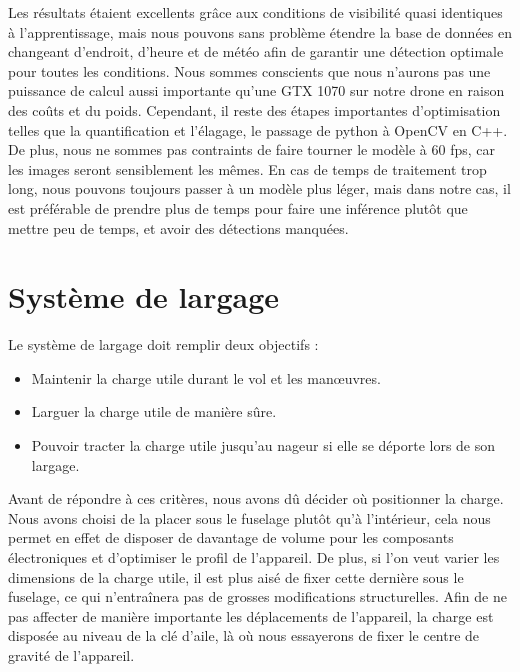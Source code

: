 \documentclass[a4paper,12pt,french]{report}
\begin{document}
Les résultats étaient excellents grâce aux conditions de visibilité quasi identiques à l'apprentissage, mais nous pouvons sans problème étendre la base de données en changeant d'endroit, d'heure et de météo afin de garantir une détection optimale pour toutes les conditions. Nous sommes conscients que nous n'aurons pas une puissance de calcul aussi importante qu'une GTX 1070 sur notre drone en raison des coûts et du poids. Cependant, il reste des étapes importantes d'optimisation telles que la quantification et l'élagage, le passage de python à OpenCV en C++. De plus, nous ne sommes pas contraints de faire tourner le modèle à 60 fps, car les images seront sensiblement les mêmes. En cas de temps de traitement trop long, nous pouvons toujours passer à un modèle plus léger, mais dans notre cas, il est préférable de prendre plus de temps pour faire une inférence plutôt que mettre peu de temps, et avoir des détections manquées.\newline

\section{Système de largage}
\label{larg}
Le système de largage doit remplir deux objectifs :

\begin{itemize}
    \item Maintenir la charge utile durant le vol et les manœuvres.
    \item Larguer la charge utile de manière sûre.
    \item Pouvoir tracter la charge utile jusqu’au nageur si elle se déporte lors de son largage.\newline
\end{itemize}

Avant de répondre à ces critères, nous avons dû décider où positionner la charge. Nous avons choisi de la placer sous le fuselage plutôt qu’à l’intérieur, cela nous permet en effet de disposer de davantage de volume pour les composants électroniques et d’optimiser le profil de l’appareil. De plus, si l’on veut varier les dimensions de la charge utile, il est plus aisé de fixer cette dernière sous le fuselage, ce qui n'entraînera pas de grosses modifications structurelles. Afin de ne pas affecter de manière importante les déplacements de l’appareil, la charge est disposée au niveau de la clé d’aile, là où nous essayerons de fixer le centre de gravité de l’appareil.\newline
\end{document}
